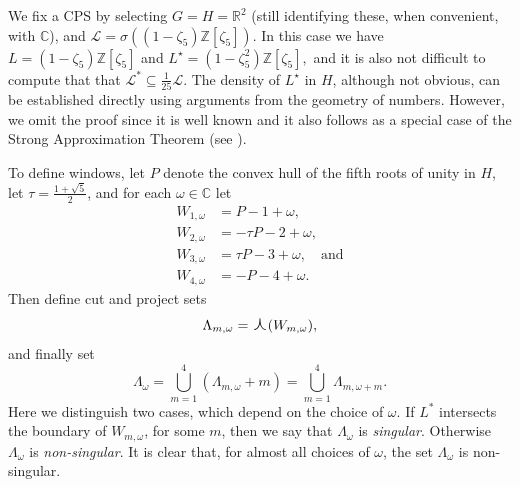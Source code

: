 \documentclass[reqno]{amsart}
\newcommand{\R}{\mathbb{R}}
\newcommand{\C}{\mathbb{C}}
\newcommand{\Z}{\mathbb{Z}}
\newcommand{\cL}{\mathcal{L}}
\newcommand{\oplam}{\mbox{\Large $\curlywedge$}}
\begin{document}
We fix a CPS by selecting $G=H=\R^2$ (still identifying these, when convenient, with $\C$), and $\cL=\sigma \left((1-\zeta_5)\Z[\zeta_5]\right)$. In this case we have $L=(1-\zeta_5)\Z[\zeta_5]$ and $L^\star=(1-\zeta_5^2)\Z[\zeta_5],$ and it is also not difficult to compute that that $\cL^*\subseteq\frac{1}{25}\cL$. The density of $L^\star$ in $H$, although not obvious, can be established directly using arguments from the geometry of numbers. However, we omit the proof since it is well known and it also follows as a special case of the Strong Approximation Theorem (see \cite[Chapter II, Section 15]{CassFroh1967}).

To define windows, let $P$ denote the convex hull of the fifth roots of unity in $H$, let $\tau=\frac{1+\sqrt{5}}{2}$, and for each $\omega\in\C$ let
\begin{align*}
	W_{1,\omega}&=P-1+\omega,\\
	W_{2,\omega}&=-\tau P-2+\omega,\\
	W_{3,\omega}&=\tau P-3+\omega,\quad\text{and}\\
	W_{4,\omega}&=-P-4+\omega.
\end{align*}
Then define cut and project sets
\[\Lambda_{m,\omega}=\oplam(W_{m,\omega}),\]
and finally set
\[\Lambda_\omega=\bigcup_{m=1}^4\left(\Lambda_{m,\omega}+m\right)=\bigcup_{m=1}^4\Lambda_{m,\omega+m}.\]
Here we distinguish two cases, which depend on the choice of $\omega$. If $L^*$ intersects the boundary of $W_{m,\omega}$, for some $m$, then we say that $\Lambda_\omega$ is \textit{singular}. Otherwise $\Lambda_\omega$ is \textit{non-singular}. It is clear that, for almost all choices of $\omega$, the set $\Lambda_\omega$ is non-singular.
\end{document}
